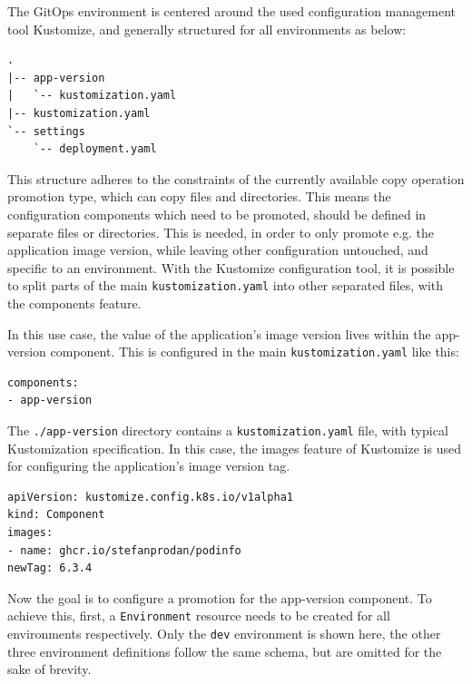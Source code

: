 The GitOps environment is centered around the used configuration management tool
Kustomize, and generally structured for all environments as below:

\begin{lstlisting}
.
|-- app-version
|   `-- kustomization.yaml
|-- kustomization.yaml
`-- settings
    `-- deployment.yaml
\end{lstlisting}

This structure adheres to the constraints of the currently available
copy operation promotion type, which can copy files and directories.
This means the configuration components which need to be promoted,
should be defined in separate files or directories.
This is needed, in order to only promote e.g. the application image version,
while leaving other configuration untouched, and specific to an environment.
With the Kustomize configuration tool, it is possible to split
parts of the main \lstinline|kustomization.yaml| into other separated files,
with the components feature.

In this use case, the value of the application's image version lives within the 
app-version component. This is configured in the main \lstinline|kustomization.yaml|
like this:

\begin{lstlisting}
components:
- app-version
\end{lstlisting}

The \lstinline|./app-version| directory contains a \lstinline|kustomization.yaml| file,
with typical Kustomization specification.
In this case, the images feature of Kustomize is used for configuring the application's
image version tag.

\begin{lstlisting}
apiVersion: kustomize.config.k8s.io/v1alpha1
kind: Component
images:
- name: ghcr.io/stefanprodan/podinfo
newTag: 6.3.4
\end{lstlisting}

Now the goal is to configure a promotion for the app-version component.
To achieve this, 
first, a \lstinline|Environment| resource needs to be created
for all environments respectively.
Only the \lstinline|dev| environment is shown here,
the other three environment definitions follow the same schema,
but are omitted for the sake of brevity.



%
%
%
%
%

